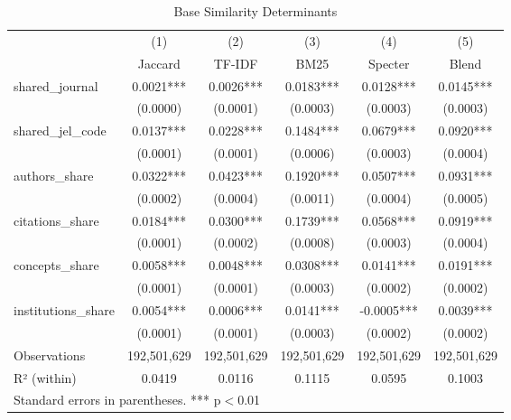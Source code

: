 \documentclass[12pt]{article}
\begin{document}
\begin{table}[htbp]\centering
\caption{Base Similarity Determinants}
\label{tab:baseline}
\begin{tabular}{l*{5}{c}}
\toprule
                    &\multicolumn{1}{c}{(1)}&\multicolumn{1}{c}{(2)}&\multicolumn{1}{c}{(3)}&\multicolumn{1}{c}{(4)}&\multicolumn{1}{c}{(5)}\\
                    &\multicolumn{1}{c}{Jaccard}&\multicolumn{1}{c}{TF-IDF}&\multicolumn{1}{c}{BM25}&\multicolumn{1}{c}{Specter}&\multicolumn{1}{c}{Blend}\\
\midrule
shared\_journal      &      0.0021***&      0.0026***&      0.0183***&      0.0128***&      0.0145***\\
                    &    (0.0000)         &    (0.0001)         &    (0.0003)         &    (0.0003)         &    (0.0003)         \\
shared\_jel\_code     &      0.0137***&      0.0228***&      0.1484***&      0.0679***&      0.0920***\\
                    &    (0.0001)         &    (0.0001)         &    (0.0006)         &    (0.0003)         &    (0.0004)         \\
authors\_share       &      0.0322***&      0.0423***&      0.1920***&      0.0507***&      0.0931***\\
                    &    (0.0002)         &    (0.0004)         &    (0.0011)         &    (0.0004)         &    (0.0005)         \\
citations\_share     &      0.0184***&      0.0300***&      0.1739***&      0.0568***&      0.0919***\\
                    &    (0.0001)         &    (0.0002)         &    (0.0008)         &    (0.0003)         &    (0.0004)         \\
concepts\_share      &      0.0058***&      0.0048***&      0.0308***&      0.0141***&      0.0191***\\
                    &    (0.0001)         &    (0.0001)         &    (0.0003)         &    (0.0002)         &    (0.0002)         \\
institutions\_share  &      0.0054***&      0.0006***&      0.0141***&     -0.0005***&      0.0039***\\
                    &    (0.0001)         &    (0.0001)         &    (0.0003)         &    (0.0002)         &    (0.0002)         \\
\midrule
Observations        & 192,501,629         & 192,501,629         & 192,501,629         & 192,501,629         & 192,501,629         \\
R² (within)         &      0.0419         &      0.0116         &      0.1115         &      0.0595         &      0.1003         \\
\bottomrule
\multicolumn{6}{l}{\footnotesize Standard errors in parentheses. *** p$<$0.01}
\end{tabular}
\end{table}
\end{document}
